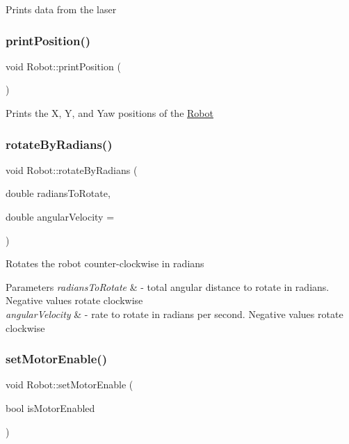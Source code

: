 Prints data from the laser \mbox{\label{classRobot_a64aeca7dab240ea7d56adf4de8448cba}} 
\subsubsection{\texorpdfstring{print\+Position()}{printPosition()}}
{\footnotesize\ttfamily void Robot\+::print\+Position (\begin{DoxyParamCaption}{ }\end{DoxyParamCaption})}

Prints the X, Y, and Yaw positions of the \hyperlink{classRobot}{Robot} \mbox{\label{classRobot_a4e139756e0d56b718ff5c19daa7c5f57}} 
\subsubsection{\texorpdfstring{rotate\+By\+Radians()}{rotateByRadians()}}
{\footnotesize\ttfamily void Robot\+::rotate\+By\+Radians (\begin{DoxyParamCaption}\item[{double}]{radians\+To\+Rotate,  }\item[{double}]{angular\+Velocity = {} }\end{DoxyParamCaption})}

Rotates the robot counter-\/clockwise in radians


\begin{DoxyParams}{Parameters}
{\em radians\+To\+Rotate} & -\/ total angular distance to rotate in radians. Negative values rotate clockwise \\
\hline
{\em angular\+Velocity} & -\/ rate to rotate in radians per second. Negative values rotate clockwise \\
\hline
\end{DoxyParams}
\mbox{\label{classRobot_ae59cdda4345c38cff6157f78a417b102}} 
\subsubsection{\texorpdfstring{set\+Motor\+Enable()}{setMotorEnable()}}
{\footnotesize\ttfamily void Robot\+::set\+Motor\+Enable (\begin{DoxyParamCaption}\item[{bool}]{is\+Motor\+Enabled }\end{DoxyParamCaption})}


